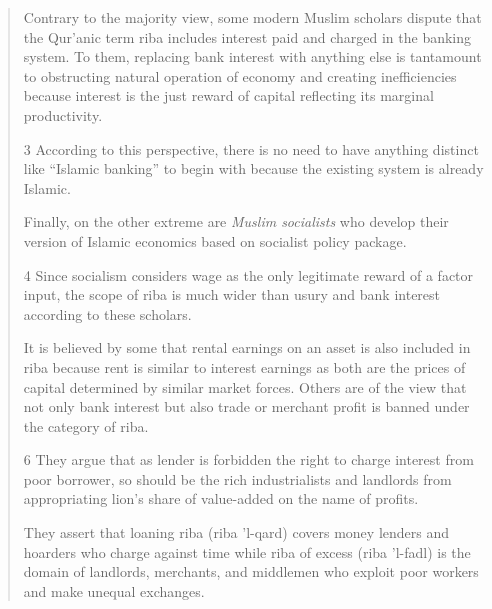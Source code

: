 \begin{quote}
Contrary to the majority view, some modern Muslim scholars dispute that the Qur'anic term riba includes interest paid and charged in the banking system.
To them, replacing bank interest with anything else is tantamount to obstructing natural operation of economy and creating inefficiencies because interest is the just reward of capital reflecting its marginal productivity. 

3 According to this perspective, there is no need to have anything distinct like “Islamic banking” to begin with because the existing system is already Islamic.


Finally, on the other extreme are \textit{Muslim socialists} who develop their version of Islamic economics based on socialist policy package.

4 Since socialism considers wage as the only legitimate reward of a factor input, the scope of riba is much wider than usury and bank interest according to these scholars. 

It is believed by some that rental earnings on an asset is also included in riba because rent is similar to interest earnings as both are the prices of capital determined by similar market forces. Others are of the view that not only bank interest but also trade or merchant profit is banned under the category of riba.


6 They argue that as lender is forbidden the right to charge interest from poor borrower, so should be the rich industrialists and landlords from appropriating lion's share of value-added on the name of profits.

They assert that loaning riba (riba 'l-qard) covers money lenders and hoarders who charge against time while riba of excess (riba 'l-fadl) is the domain of landlords, merchants, and middlemen who exploit poor workers and make unequal exchanges. 


\end{quote}
